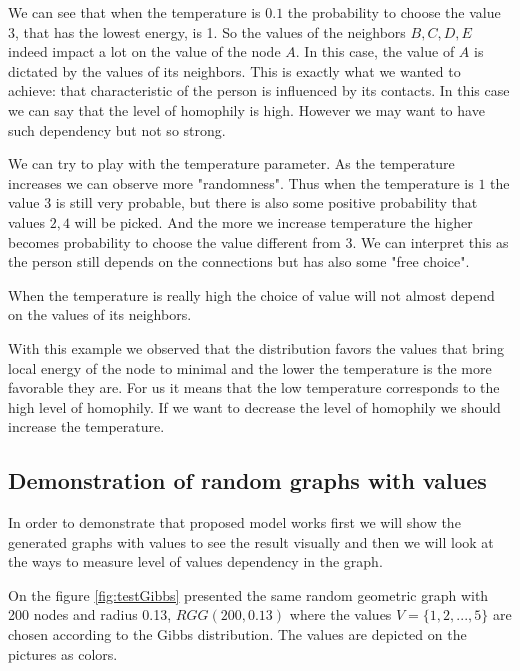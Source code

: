 \documentclass[12pt]{report}
\begin{document}
We can see that when the temperature is $0.1$ the probability to choose the value 3, that has the lowest energy, is 1. So the values of the neighbors $B, C, D, E$ indeed impact a lot on the value of the node $A$. In this case, the value of $A$ is dictated by the values of its neighbors. This is exactly what we wanted to achieve: that characteristic of the person is influenced by its contacts. In this case we can say that the level of homophily is high. However we may want to have such dependency but not so strong.

We can try to play with the temperature parameter. As the temperature increases we can observe more "randomness". Thus when the temperature is $1$ the value $3$ is still very probable, but there is also some positive probability that values $2, 4$ will be picked. And the more we increase temperature the higher becomes probability to choose the value different from 3. We can interpret this as the person still depends on the connections but  has also some "free choice".

When the temperature is really high the choice of value will not almost depend on the values of its neighbors. 

With this example we observed that the distribution favors the values that bring local energy of the node to minimal and the lower the temperature is the more favorable they are. For us it means that the low temperature corresponds to the high level of homophily. If we want to decrease the level of homophily we should increase the temperature.

\subsection{Demonstration of random graphs with values}

In order to demonstrate that proposed model works first we will show the generated graphs with values to see the result visually and then we will look at the ways to measure level of values dependency in the graph.

On the figure \ref{fig:testGibbs} presented the same random geometric graph with 200 nodes and radius 0.13, $RGG(200, 0.13)$ where the values $V = \lbrace 1, 2, ..., 5 \rbrace$ are chosen according to the Gibbs distribution. The values are depicted on the pictures as colors.
\end{document}
